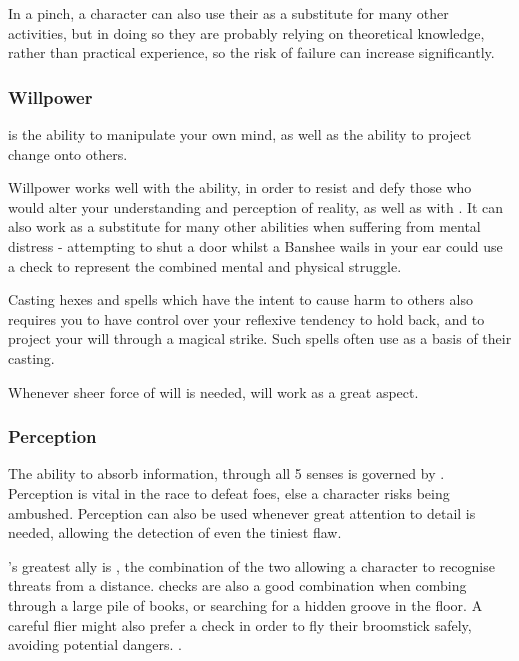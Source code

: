 In a pinch, a character can also use their  as a substitute for many other activities, but in doing so they are probably relying on theoretical knowledge, rather than practical experience, so the risk of failure can increase significantly. 

\subsubsection{Willpower}

 is the ability to manipulate your own mind, as well as the ability to project change onto others. 

Willpower works well with the  ability, in order to resist and defy those who would alter your understanding and perception of reality, as well as with . It can also work as a substitute for many other abilities when suffering from mental distress - attempting to shut a door whilst a Banshee wails in your ear could use a  check to represent the combined mental and physical struggle. 

Casting hexes and spells which have the intent to cause harm to others also requires you to have control over your reflexive tendency to hold back, and to project your will through a magical strike. Such spells often use  as a basis of their casting.  

Whenever sheer force of will is needed,  will work as a great aspect. 



\subsubsection{Perception}

The ability to absorb information, through all 5 senses is governed by . Perception is vital in the race to defeat foes, else a character risks being ambushed. Perception can also be used whenever great attention to detail is needed, allowing the detection of even the tiniest flaw.  

's greatest ally is , the combination of the two allowing a character to recognise threats from a distance.  checks are also a good combination when combing through a large pile of books, or searching for a hidden groove in the floor. A careful flier might also prefer a  check in order to fly their broomstick safely, avoiding potential dangers. . 


